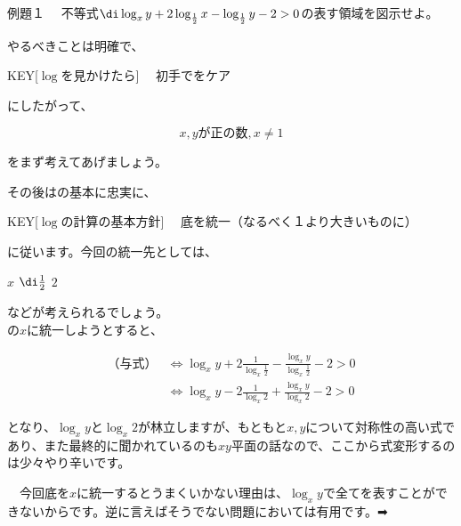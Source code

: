 \documentclass[luatex,fontsize=8pt,paper=b5,twoside,report]{jlreq}%
\begin{document}
\begin{ascolorbox4}[静岡大]{例題１}
  　不等式$\di \log_x{y} + 2\log_{\frac{1}{2}}{x} - \log_{\frac{1}{2}}{y} - 2 > 0$の表す領域を図示せよ。
\end{ascolorbox4}
\begin{multicols*}{2}%
\noindent{}

\tri やるべきことは明確で、

\begin{ptbs}{KEY}[$\log$を見かけたら]
  　初手でをケア
\end{ptbs}

にしたがって、

\[x, y が正の数, x \neq 1\]

をまず考えてあげましょう。

\tri その後はの基本に忠実に、

\begin{ptbs}{KEY}[$\log$の計算の基本方針]
  　底を統一（なるべく１より大きいものに）
\end{ptbs}

に従います。今回の統一先としては、

\begin{mydec1}\centering
   $x$ \hfill {} $\di \frac{1}{2}$ \hfill {} $2$
\end{mydec1}

などが考えられるでしょう。\\
\tri {}の$x$に統一しようとすると、

\begin{align*}
  \text{（与式）} &\Leftrightarrow \log_x{y} + 2 \frac{1}{\log_x{\frac{1}{2}}} - \frac{\log_x{y}}{\log_x{\frac{1}{2}}} - 2 > 0\\
  &\Leftrightarrow  \log_x{y} - 2 \frac{1}{\log_x{2}} + \frac{\log_x{y}}{\log_x{2}} - 2 > 0
\end{align*}

となり、$\log_x{y}$と$\log_x{2}$が林立しますが、もともと$x, y$について対称性の高い式であり、また最終的に聞かれているのも$xy$平面の話なので、ここから式変形するのは少々やり辛いです。

\begin{mydec4}
　今回底を$x$に統一するとうまくいかない理由は、$\log_x{y}$で全てを表すことができないからです。逆に言えばそうでない問題においては有用です。➡︎
\end{mydec4}


\end{multicols*}
\end{document}
